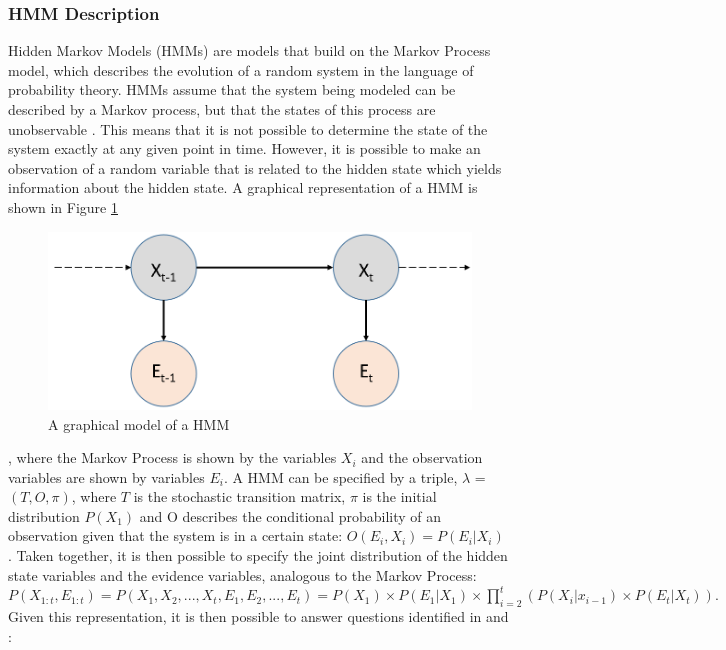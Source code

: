 \subsubsection{HMM Description}\label{subsubsec:HMMDesc}
Hidden Markov Models (HMMs) are models that build on the Markov Process model, which describes the evolution of a random system in the language of probability theory. HMMs assume that the system being modeled can be described by a Markov process, but that the states of this process are unobservable \cite{Ghahramani2001AnNetworks}. This means that it is not possible to determine the state of the system exactly at any given point in time. However, it is possible to make an observation of a random variable that is related to the hidden state which yields information about the hidden state. A graphical representation of a HMM is shown in Figure \ref{fig:hmm}
\begin{figure}[]
    \centering
    \includegraphics[width=0.8\linewidth]{Chapters/BackgroundKnowledgeAndRelatedWork/MultiAgentTargetDetectionBackground/Figs/HMMs/HMMGraphicalModel.png}
    \caption{A graphical model of a HMM}
    \label{fig:hmm}
\end{figure}
, where the Markov Process is shown by the variables $X_i$ and the observation variables are shown by variables $E_i$. A HMM can be specified by a triple, $\lambda$ = $(T, O, \pi)$, where $T$ is the stochastic transition matrix, $\pi$ is the initial distribution $P(X_1)$ and O describes the conditional probability of an observation given that the system is in a certain state: $O(E_i, X_i) = P(E_{i} | X_{i})$ \cite{Rabiner1989ARecognition}. Taken together, it is then possible to specify the joint distribution of the hidden state variables and the evidence variables, analogous to the Markov Process: 
$
P(X_{1:t}, E_{1:t}) = P(X_1, X_2, ..., X_t, E_1, E_2, ..., E_t) = P(X_1) \times P(E_1 | X_1) \times
\prod_{i=2}^{t}{(P(X_i | x_{i-1}) \times P(E_t | X_t))}.
$Given this representation, it is then possible to answer questions identified in \cite{Rabiner1989ARecognition} and \cite{Murphy1994DynamicLearning}:
